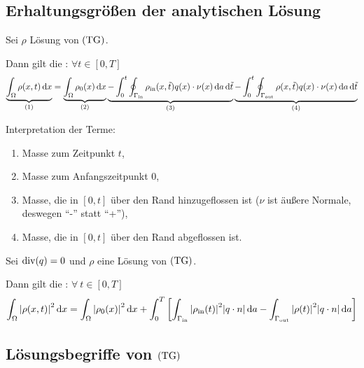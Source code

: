 \subsection{Erhaltungsgrößen der analytischen Lösung}
\label{subsec:Erhaltungsgroessen der analytischen Loesung}
\begin{Lemma}[Massenbilanz]
	\label{Massenbilanz}
	
	Sei $ \rho $ Lösung von $ \operatorname{(TG)} $. 
	
	Dann gilt die : $ \forall t \in [0,T] $
	\[ \underbrace{\int_{\Omega} \rho(x,t) \mathop{}\!\mathrm{d} x}_{(1)} = \underbrace{\int_{\Omega} \rho_0(x) \mathop{}\!\mathrm{d} x}_{(2)}  \underbrace{-\int_{0}^{t} \oint_{\Gamma_{{\text{in}}}} \rho_{\text{in}}(x,\tilde{t}) q(x) \cdot \nu(x) \mathop{}\!\mathrm{d} a \mathop{}\!\mathrm{d} \tilde{t}}_{(3)} \underbrace{- \int_{0}^{t} \oint_{\Gamma_{{\text{out}}}} \rho(x,\tilde{t}) q(x) \cdot \nu(x) \mathop{}\!\mathrm{d} a \mathop{}\!\mathrm{d} \tilde{t}}_{(4)} \]
\end{Lemma}
	Interpretation der Terme:
	\begin{enumerate}[label=(\arabic*)]
		\item Masse zum Zeitpunkt $ t $,
		\item Masse zum Anfangszeitpunkt $ 0 $,
		\item Masse, die in $ [0,t] $ über den Rand hinzugeflossen ist ($ \nu $ ist äußere Normale, deswegen \enquote{-} statt \enquote{+}),
		\item Masse, die in $ [0,t] $ über den Rand abgeflossen ist.
	\end{enumerate}

\begin{Lemma}[Energiebilanz]
	\label{Energiegleichung}
	
	Sei $ \operatorname{div}(q) = 0 $ und $ \rho $ eine Lösung von $ \operatorname{(TG)} $. 
	
	Dann gilt die : $ \forall \ t\in [0,T] $
	\[\int_{\Omega} \abs{\rho(x,t)}^2 \mathop{}\!\mathrm{d} x = \int_{\Omega} \abs{\rho_0(x)}^2 \mathop{}\!\mathrm{d} x  + \int_{0}^{T} \left[ \int_{\Gamma_{{\text{in}}}}\abs{\rho_{\text{in}}(t)}^2 \abs{q\cdot n} \mathop{}\!\mathrm{d} a - \int_{\Gamma_{{\text{out}}}} \abs{\rho(t)}^2 \abs{q\cdot n} \mathop{}\!\mathrm{d} a  \right] \]
\end{Lemma}

\subsection{Lösungsbegriffe von $ \operatorname{(TG)} $}

